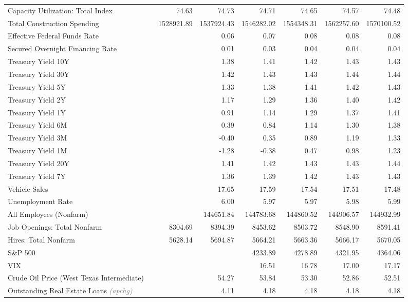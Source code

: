 \documentclass[11pt, letterpaper]{article}\usepackage[]{graphicx}\usepackage[]{color}
\begin{document}
\begin{table}[H]
\begin{tabular}{lrrrrrrr}
  Capacity Utilization: Total Index &  & 74.63 & 74.73 & 74.71 & 74.65 & 74.57 & 74.48 \\ 
  Total Construction Spending &  & 1528921.89 & 1537924.43 & 1546282.02 & 1554348.31 & 1562257.60 & 1570100.52 \\ 
  Effective Federal Funds Rate &  &  & 0.06 & 0.07 & 0.08 & 0.08 & 0.08 \\ 
  Secured Overnight Financing Rate &  &  & 0.01 & 0.03 & 0.04 & 0.04 & 0.04 \\ 
  Treasury Yield 10Y &  &  & 1.38 & 1.41 & 1.42 & 1.43 & 1.43 \\ 
  Treasury Yield 30Y &  &  & 1.42 & 1.43 & 1.43 & 1.44 & 1.44 \\ 
  Treasury Yield 5Y &  &  & 1.33 & 1.38 & 1.41 & 1.42 & 1.43 \\ 
  Treasury Yield 2Y &  &  & 1.17 & 1.29 & 1.36 & 1.40 & 1.42 \\ 
  Treasury Yield 1Y &  &  & 0.91 & 1.14 & 1.29 & 1.37 & 1.41 \\ 
  Treasury Yield 6M &  &  & 0.39 & 0.84 & 1.14 & 1.30 & 1.38 \\ 
  Treasury Yield 3M &  &  & -0.40 & 0.35 & 0.89 & 1.19 & 1.33 \\ 
  Treasury Yield 1M &  &  & -1.28 & -0.38 & 0.47 & 0.98 & 1.23 \\ 
  Treasury Yield 20Y &  &  & 1.41 & 1.42 & 1.43 & 1.43 & 1.44 \\ 
  Treasury Yield 7Y &  &  & 1.36 & 1.39 & 1.42 & 1.43 & 1.43 \\ 
  Vehicle Sales &  &  & 17.65 & 17.59 & 17.54 & 17.51 & 17.48 \\ 
  Unemployment Rate &  &  & 6.00 & 5.97 & 5.97 & 5.98 & 5.99 \\ 
  All Employees (Nonfarm) &  &  & 144651.84 & 144783.68 & 144860.52 & 144906.57 & 144932.99 \\ 
  Job Openings: Total Nonfarm &  & 8304.69 & 8394.39 & 8453.62 & 8503.72 & 8548.90 & 8591.41 \\ 
  Hires: Total Nonfarm &  & 5628.14 & 5694.87 & 5664.21 & 5663.36 & 5666.17 & 5670.05 \\ 
  S\&P 500 &  &  &  & 4233.89 & 4278.89 & 4321.95 & 4364.06 \\ 
  VIX &  &  &  & 16.51 & 16.78 & 17.00 & 17.17 \\ 
  Crude Oil Price (West Texas Intermediate) &  &  & 54.27 & 53.84 & 53.30 & 52.86 & 52.51 \\ 
  Outstanding Real Estate Loans \textit{\footnotesize\textcolor{gray}{(apchg)}} &  &  & 4.11 & 4.18 & 4.18 & 4.18 & 4.18 \\ 

\end{tabular}
\end{table}
\end{document}
